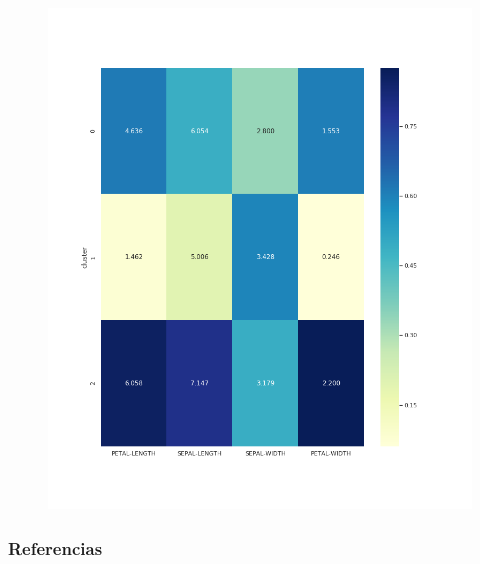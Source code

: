 \documentclass[spanish]{beamer}
\begin{document}
\begin{frame}
\begin{figure}[h]
\centering
\includegraphics[scale=0.29]{dani/heatmapMeanShiftIRIS.png}
\end{figure}
\end{frame}


\begin{frame}
  \frametitle{Referencias}
        
        
\end{frame}
\end{document}
